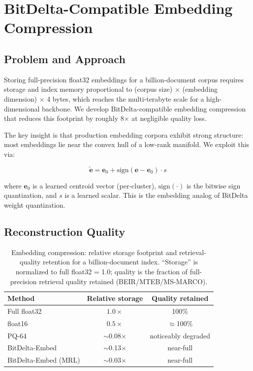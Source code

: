 \documentclass[11pt,a4paper]{article}
\begin{document}
\section{BitDelta-Compatible Embedding Compression}
\label{sec:compression}

\subsection{Problem and Approach}

Storing full-precision float32 embeddings for a billion-document corpus requires storage and index memory proportional to (corpus size) $\times$ (embedding dimension) $\times$ 4 bytes, which reaches the multi-terabyte scale for a high-dimensional backbone. We develop BitDelta-compatible embedding compression that reduces this footprint by roughly 8$\times$ at negligible quality loss.

The key insight is that production embedding corpora exhibit strong structure: most embeddings lie near the convex hull of a low-rank manifold. We exploit this via:

\begin{equation}
\tilde{\mathbf{e}} = \mathbf{e}_0 + \text{sign}(\mathbf{e} - \mathbf{e}_0) \cdot s
\end{equation}

where $\mathbf{e}_0$ is a learned centroid vector (per-cluster), $\text{sign}(\cdot)$ is the bitwise sign quantization, and $s$ is a learned scalar. This is the embedding analog of BitDelta weight quantization.

\subsection{Reconstruction Quality}

\begin{table}[H]
\centering
\caption{Embedding compression: relative storage footprint and retrieval-quality
retention for a billion-document index. ``Storage'' is normalized to full float32 = 1.0;
quality is the fraction of full-precision retrieval quality retained (BEIR/MTEB/MS-MARCO).}
\label{tab:compression}
\begin{tabular}{lcc}
\toprule
Method & Relative storage & Quality retained \\
\midrule
Full float32             & $1.0\times$    & 100\% \\
float16                  & $0.5\times$    & $\approx$100\% \\
PQ-64                    & $\sim$0.08$\times$ & noticeably degraded \\
BitDelta-Embed           & $\sim$0.13$\times$ & near-full \\
BitDelta-Embed (MRL)     & $\sim$0.03$\times$ & near-full \\
\bottomrule
\end{tabular}
\end{table}
\end{document}
